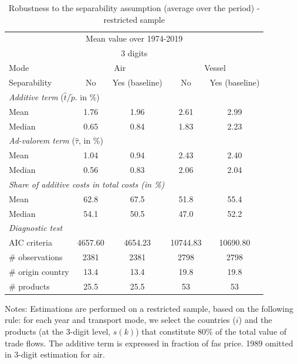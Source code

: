 \documentclass[a4paper,11pt]{article}
\begin{document}
\begin{table}[htbp]
  \centering
  \caption{Robustness to the separability assumption (average over the period) - restricted sample}
\begin{center}
    \begin{tabular}{lcc|cc}
    \hline \hline
    \multicolumn{5}{c}{Mean value over 1974-2019} \\
 \multicolumn{5}{c}{3 digits} \\    \hline \hline
   Mode  & \multicolumn{2}{c|}{Air} & \multicolumn{2}{c}{Vessel} \\ \hline
   Separability & No  & Yes (baseline) & No & Yes (baseline)\\ \hline
    \multicolumn{5}{l}{\textit{Additive term} ($\widehat{t}/\widetilde{p}$.
in \%)}  \\
    Mean  & 1.76 & 1.96 & 2.61 & 2.99 \\
    Median &0.65 & 0.84 &1.83 & 2.23 \\ \hline
    \multicolumn{5}{l}{\textit{Ad-valorem term} ($\widehat{\tau}$, in \%)}\\
    Mean  & 1.04 & 0.94 & 2.43 & 2.40 \\
    Median & 0.56 & 0.83 & 2.06 & 2.04 \\ \hline
\multicolumn{5}{l}{\textit{Share of additive costs in total costs (in \%)}} \\
    Mean  & 62.8  & 67.5  & 51.8  & 55.4 \\
    Median & 54.1  & 50.5  & 47.0  & 52.2 \\  \hline
 \textit{Diagnostic test} & & &  &  \\
    AIC criteria & 4657.60 & 4654.23 & 10744.83 & 10690.80 \\ \hline
\# observations & 2381 & 2381 & 2798 & 2798 \\
\# origin country & 13.4 & 13.4 & 19.8 & 19.8 \\
\# products & 25.5 & 25.5 & 53 & 53 \\ \hline \hline
    \end{tabular}%
\end{center}
\parbox[l]{12cm}{\footnotesize{Notes: Estimations are performed on a restricted sample, based on the following rule: for each year and transport mode, we select the countries ($i$) and the products (at the 3-digit level, $s(k)$) that constitute 80\% of the total value of trade flows.
The additive term is expressed in fraction of fas price. 1989 omitted in 3-digit estimation for air.}}
\label{tab:robustness_separability}
\end{table}
\end{document}
